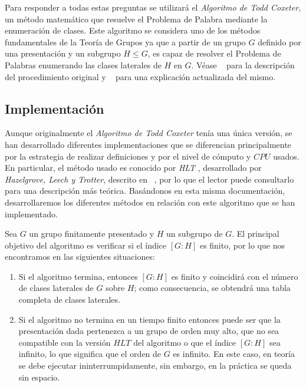 Para responder a todas estas preguntas se utilizará el \textit{Algoritmo de Todd Coxeter}, un método matemático que resuelve el Problema de Palabra mediante la enumeración de clases.  Este algoritmo se considera uno de los métodos fundamentales de la Teoría de Grupos ya que a partir de un grupo $G$ definido por una presentación y un subgrupo $H \leq G$, es capaz de resolver el Problema de Palabras enumerando las clases laterales de $H$ en $G$. Véase ~\cite{todd} para la descripción del procedimiento original y ~\cite{kmill} para una explicación actualizada del mismo.




\subsection{Implementación} \label{implementacion}
Aunque originalmente el \textit{Algoritmo de Todd Coxeter} tenía una única versión, se han desarrollado diferentes implementaciones que se diferencian principalmente por la estrategia de realizar definiciones y por el nivel de cómputo y $CPU$ usados. En particular, el método usado es conocido por \textit{HLT} , desarrollado por \textit{Hazelgrove, Leech y Trotter}, descrito en ~\cite{green}, por lo que el lector puede consultarlo para una descripción más teórica. Basándonos en esta misma documentación, desarrollaremos los diferentes métodos en relación con este algoritmo que se han implementado.


Sea $G$ un grupo finitamente presentado y $H$ un subgrupo de $G$. El principal objetivo del algoritmo es verificar si el índice  $[G:H]$ es finito, por lo que nos encontramos en las siguientes situaciones:
\begin{enumerate}
    \item Si el algoritmo termina, entonces $[G:H]$ es finito y coincidirá con el número de clases laterales de $G$ sobre $H$; como consecuencia, se obtendrá una tabla completa de clases laterales.
    
    \item Si el algoritmo no termina en un tiempo finito entonces puede ser que la presentación dada pertenezca a un grupo de orden muy alto, que no sea compatible con la versión $HLT$ del algoritmo  o que el índice $[G:H]$ sea infinito, lo que significa que el orden de $G$ es infinito. En este caso, en teoría se debe ejecutar ininterrumpidamente, sin embargo, en la práctica se queda sin espacio. \label{disj}
    

\end{enumerate}

